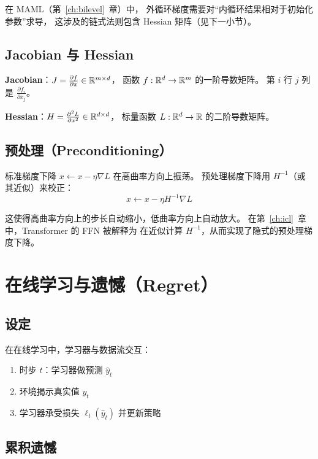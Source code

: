 在 MAML（第~\ref{ch:bilevel}~章）中，
外循环梯度需要对``内循环结果相对于初始化参数''求导，
这涉及的链式法则包含 Hessian 矩阵（见下一小节）。

\subsection{Jacobian 与 Hessian}

\textbf{Jacobian}：$J = \frac{\partial f}{\partial x} \in \mathbb{R}^{m \times d}$，
函数 $f: \mathbb{R}^d \to \mathbb{R}^m$ 的一阶导数矩阵。
第 $i$ 行 $j$ 列是 $\frac{\partial f_i}{\partial x_j}$。

\textbf{Hessian}：$H = \frac{\partial^2 L}{\partial x^2} \in \mathbb{R}^{d \times d}$，
标量函数 $L: \mathbb{R}^d \to \mathbb{R}$ 的二阶导数矩阵。

\subsection{预处理（Preconditioning）}

标准梯度下降 $x \leftarrow x - \eta \nabla L$ 在高曲率方向上振荡。
预处理梯度下降用 $H^{-1}$（或其近似）来校正：
\[
  x \leftarrow x - \eta H^{-1} \nabla L
\]

这使得高曲率方向上的步长自动缩小，低曲率方向上自动放大。
在第~\ref{ch:icl}~章中，Transformer 的 FFN 被解释为
在近似计算 $H^{-1}$，从而实现了隐式的预处理梯度下降。

\section{在线学习与遗憾（Regret）}
\label{sec:app_online}

\subsection{设定}

在在线学习中，学习器与数据流交互：
\begin{enumerate}
  \item 时步 $t$：学习器做预测 $\hat{y}_t$
  \item 环境揭示真实值 $y_t$
  \item 学习器承受损失 $\ell_t(\hat{y}_t)$ 并更新策略
\end{enumerate}

\subsection{累积遗憾}

